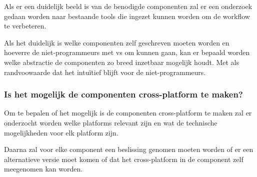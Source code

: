 Als er een duidelijk beeld is van de benodigde componenten zal er een onderzoek gedaan worden naar bestaande tools die ingezet kunnen worden om de workflow te verbeteren.

Als het duidelijk is welke componenten zelf geschreven moeten worden en hoeverre de niet-programmeurs met \gls{vs} om kunnen gaan, kan er bepaald worden welke abstractie de componenten zo breed inzetbaar mogelijk houdt. Met als randvoowaarde dat het intuïtief blijft voor de niet-programmeurs.

\subsubsection{Is het mogelijk de componenten cross-platform te maken?}
Om te bepalen of het mogelijk is de componenten cross-platform te maken zal er onderzocht worden welke platforms relevant zijn en wat de technische mogelijkheden voor elk platform zijn.

Daarna zal voor elke component een beslissing genomen moeten worden of er een alternatieve versie moet komen of dat het cross-platform in de component zelf meegenomen kan worden.
